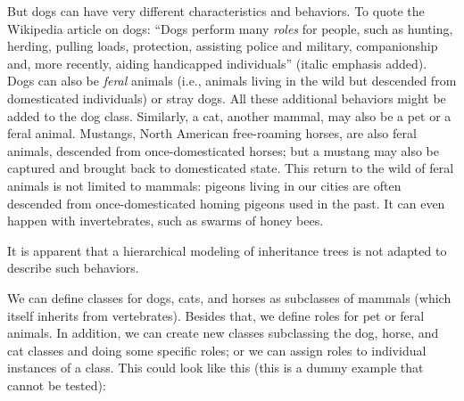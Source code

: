 But dogs can have very different characteristics and behaviors.
To quote the Wikipedia article on dogs: ``Dogs perform many 
\emph{roles} for people, such as hunting, herding, pulling 
loads, protection, assisting police and military, companionship 
and, more recently, aiding handicapped individuals'' (italic emphasis 
added). Dogs can also be \emph{feral} animals 
(i.e., animals living in the wild but 
descended from domesticated individuals) or stray dogs. All 
these additional behaviors might be added to the dog class. 
Similarly, a cat, another mammal, may also be a pet 
or a feral animal. Mustangs, North American free-roaming horses, 
are also feral animals, descended from once-domesticated horses; 
but a mustang may also be captured and brought back to 
domesticated state. This return to the wild of feral animals 
is not limited to mammals: pigeons living in our cities are 
often descended from once-domesticated homing pigeons used 
in the past. It can even happen with invertebrates, such 
as swarms of honey bees.

It is apparent that a hierarchical modeling of inheritance 
trees is not adapted to describe such behaviors. 

  
We can define classes for dogs, cats, and horses as subclasses 
of mammals (which itself inherits from vertebrates). Besides 
that, we define roles for pet or feral animals. In addition, 
we can create new classes subclassing the dog, horse, and cat 
classes and doing some specific roles; or we can assign roles 
to individual instances of a class. This could look like this 
(this is a dummy example that cannot be tested):

